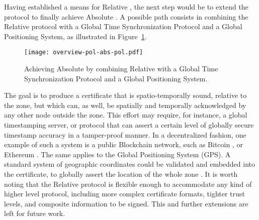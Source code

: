 Having established a means for Relative \pol{}, the next step would be to extend the protocol to finally achieve Absolute \pol{}. A possible path consists in combining the Relative \pol{} protocol with a Global Time Synchronization Protocol and a Global Positioning System, as illustrated in Figure~\ref{fig:proof-of-location-overview-absolute-pol}.

\begin{figure}[h!]
    \begin{center}
    \texttt{[image: overview-pol-abs-pol.pdf]}
    \caption{Achieving Absolute \pol{} by combining Relative \pol{} with a Global Time Synchronization Protocol and a Global Positioning System.}
    \label{fig:proof-of-location-overview-absolute-pol}
    \end{center}
\end{figure}

The goal is to produce a \pol{} certificate that is spatio-temporally sound, relative to the zone, but which can, as well, be spatially and temporally acknowledged by any other node outside the zone. This effort may require, for instance, a global timestamping server, or protocol that can assert a certain level of globally secure timestamp accuracy in a tamper-proof manner. In a decentralized fashion, one example of such a system is a public Blockchain network, such as Bitcoin \cite{nakamoto2008bitcoin}, or Ethereum \cite{buterin2014next}. The same applies to the Global Positioning System (GPS). A standard system of geographic coordinates could be validated and embedded into the \pol{} certificate, to globally assert the location of the whole zone \cite{amoretti2018blockchain ,nosouhi2020blockchain}. It is worth noting that the Relative \pol{} protocol is flexible enough to accommodate any kind of higher level protocol, including more complex certificate formats, tighter trust levels, and composite information to be signed. This and further extensions are left for future work.